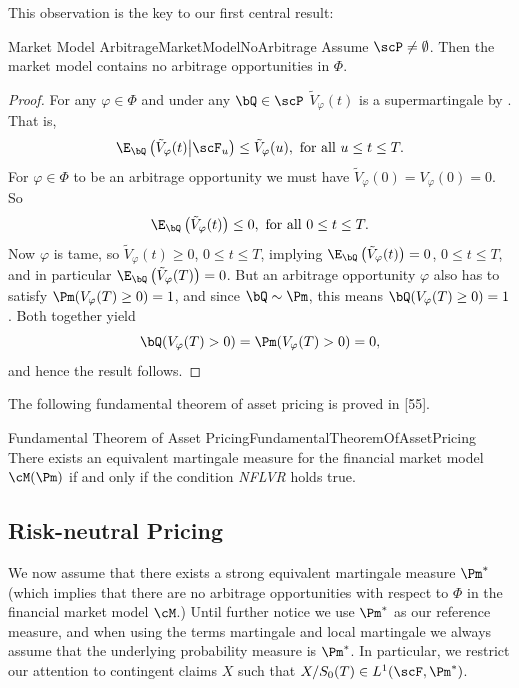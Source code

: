 This observation is the key to our first central result:

\begin{thm}{Market Model Arbitrage}{MarketModelNoArbitrage}
	Assume $\scP \neq \emptyset$. Then the market model contains no arbitrage opportunities in $\Phi$.
\end{thm}

\begin{proof}
	For any $\varphi \in \Phi$ and under any $\bQ \in \scP$ $\tilde{V}_{\varphi}(t)$ is a supermartingale by . That is,
	\[
		\E_{\bQ}\left(\tilde{V}_{\varphi}(t) \middle| \scF_u\right) \le \tilde{V}_{\varphi}(u), \text{ for all } u \le t \le T.
	\]
	For $\varphi \in \Phi$ to be an arbitrage opportunity we must have $\tilde{V}_{\varphi}(0) = V_{\varphi}(0) = 0$. So
	\[
		\E_{\bQ}\left(\tilde{V}_{\varphi}(t)\right) \le 0, \text{ for all } 0 \le t \le T.
	\]
	Now $\varphi$ is tame, so $\tilde{V}_{\varphi}(t) \ge 0$, $0 \le t \le T$, implying $\E_{\bQ}\left(\tilde{V}_{\varphi}(t)\right) = 0$, $0 \le t \le T$, and in particular $\E_{\bQ}\left(\tilde{V}_{\varphi}(T)\right) = 0$. But an arbitrage opportunity $\varphi$ also has to satisfy $\Pm(V_{\varphi}(T) \ge 0) = 1$, and since $\bQ \sim \Pm$, this means $\bQ(V_{\varphi}(T) \ge 0) = 1$. Both together yield
	\[
		\bQ(V_{\varphi}(T) > 0) = \Pm(V_{\varphi}(T) > 0) = 0,
	\]
	and hence the result follows.
\end{proof}

The following fundamental theorem of asset pricing is proved in [55].

\begin{thm}{Fundamental Theorem of Asset Pricing}{FundamentalTheoremOfAssetPricing}
	There exists an equivalent martingale measure for the financial market model $\cM(\Pm)$ if and only if the condition \textit{NFLVR} holds true.
\end{thm}

\subsection{Risk-neutral Pricing}

We now assume that there exists a strong equivalent martingale measure $\Pm^*$ (which implies that there are no arbitrage opportunities with respect to $\Phi$ in the financial market model $\cM$.) Until further notice we use $\Pm^*$ as our reference measure, and when using the terms martingale and local martingale we always assume that the underlying probability measure is $\Pm^*$. In particular, we restrict our attention to contingent claims $X$ such that $X/S_0(T) \in L^1(\scF, \Pm^*)$.

